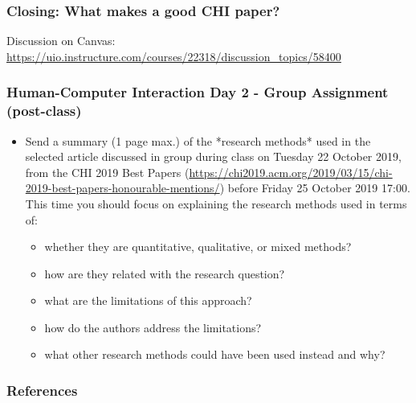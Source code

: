 \documentclass[screen, aspectratio=169]{beamer}
\begin{document}
%
\begin{frame}
\frametitle{Closing: What makes a good CHI paper?}
Discussion on Canvas: \url{https://uio.instructure.com/courses/22318/discussion_topics/58400}
\end{frame}
%
%
\begin{frame}
\frametitle{Human-Computer Interaction Day 2 - Group Assignment (post-class)}
\begin{itemize}
\item Send a summary (1 page max.)  of the *research methods* used in the selected article discussed in group during class on Tuesday 22 October 2019, from the CHI 2019 Best Papers (\url{https://chi2019.acm.org/2019/03/15/chi-2019-best-papers-honourable-mentions/}) before Friday 25 October 2019 17:00.  \\
This time you should focus on explaining the research methods used in terms of:
\begin{itemize} 
\item whether they are quantitative, qualitative, or mixed methods?
\item how are they related with the research question?
\item what are the limitations of this approach?
\item how do the authors address the limitations? 
\item what other research methods could have been used instead and why?
\end{itemize}
\end{itemize}
\end{frame}
%
%
\begin{frame}[shrink=20]
  \frametitle{References}
  \printbibliography
\end{frame}
%
\end{document}
